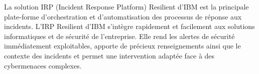 La solution IRP (Incident Response Platform) Resilient d’IBM est la principale plate-forme d’orchestration et d’automatisation des processus de réponse aux incidents. L'IRP Resilient d'IBM s'intègre rapidement et facilement aux solutions informatiques et de sécurité de l'entreprise. Elle rend les alertes de sécurité immédiatement exploitables, apporte de précieux renseignements ainsi que le contexte des incidents et permet une intervention adaptée face à des cybermenaces complexes.
